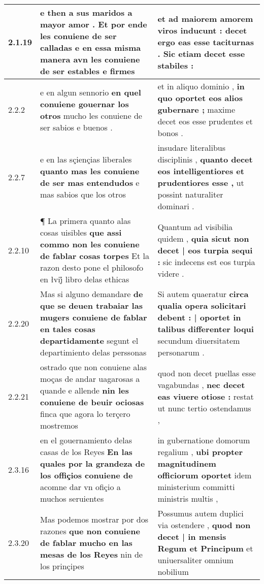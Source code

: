 \begin{tabular}{|p{1cm}|p{6.5cm}|p{6.5cm}|}
2.1.19 & e then a sus maridos a mayor amor . \textbf{ Et por ende les conuiene de ser calladas } e en essa misma manera avn les conuiene de ser estables e firmes & et ad maiorem amorem viros inducunt : \textbf{ decet ergo eas esse taciturnas . } Sic etiam decet esse stabiles : \\\hline
2.2.2 & e en algun sennorio \textbf{ en quel conuiene gouernar los otros } mucho les conuiene de ser sabios e buenos . & et in aliquo dominio , \textbf{ in quo oportet eos alios gubernare ; } maxime decet eos esse prudentes et bonos . \\\hline
2.2.7 & e en las sçiençias liberales \textbf{ quanto mas les conuiene de ser mas entendudos } e mas sabios que los otros & insudare literalibus disciplinis , \textbf{ quanto decet eos intelligentiores et prudentiores esse , } ut possint naturaliter dominari . \\\hline
2.2.10 & ¶ La primera quanto alas cosas uisibles \textbf{ que assi commo non les conuiene de fablar cosas torpes } Et la razon desto pone el philosofo en łvij̊ libro delas ethicas & Quantum ad visibilia quidem , \textbf{ quia sicut non decet | eos turpia sequi : } sic indecens est eos turpia videre . \\\hline
2.2.20 & Mas si alguno demandare \textbf{ de que se deuen trabaiar las mugers conuiene de fablar en tales cosas departidamente } segunt el departimiento delas perssonas & Si autem quaeratur \textbf{ circa qualia opera solicitari debent : | oportet in talibus differenter loqui } secundum diuersitatem personarum . \\\hline
2.2.21 & ostrado que non conuiene alas moças de andar uagarosas a quande e allende \textbf{ nin les conuiene de beuir ociosas } finca que agora lo terçero mostremos & quod non decet puellas esse vagabundas , \textbf{ nec decet eas viuere otiose : } restat ut nunc tertio ostendamus , \\\hline
2.3.16 & en el gouernamiento delas casas de los Reyes \textbf{ En las quales por la grandeza de los offiçios conuiene de } acomne dar vn ofiçio a muchos seruientes & in gubernatione domorum regalium , \textbf{ ubi propter magnitudinem officiorum oportet } idem ministerium committi ministris multis , \\\hline
2.3.20 & Mas podemos mostrar por dos razones \textbf{ que non conuiene de fablar mucho en las mesas de los Reyes } nin de los prinçipes & Possumus autem duplici via ostendere , \textbf{ quod non decet | in mensis Regum et Principum } et uniuersaliter omnium nobilium \\\hline

\end{tabular}
